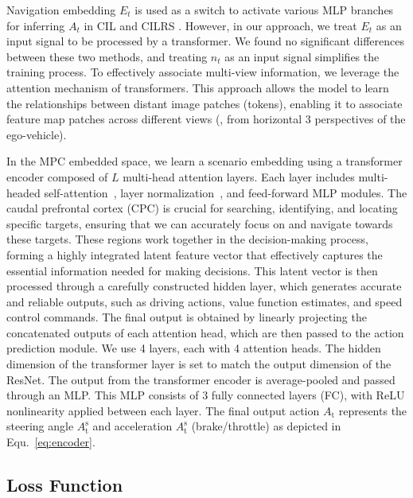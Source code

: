 Navigation embedding $E_{t}$ is used as a switch to activate various MLP branches for inferring $A_{t}$ in CIL \cite{Codevilla:2018} and CILRS \cite{Codevilla:2019}. 
However, in our approach, we treat $E_{t}$ as an input signal to be processed by a transformer. 
We found no significant differences between these two methods, and treating $n_{t}$ as an input signal simplifies the training process.
%
To effectively associate multi-view information, we leverage the attention mechanism of transformers\cite{Vaswani:2017}. 
This approach allows the model to learn the relationships between distant image patches (tokens), enabling it to associate feature map patches across different views ({\ie}, from horizontal 3 perspectives of the ego-vehicle). 


In the MPC embedded space, we learn a scenario embedding using a transformer encoder composed of $L$ multi-head attention layers. 
Each layer includes multi-headed self-attention~\cite{Vaswani:2017}, layer normalization~\cite{Ba:2016}, and feed-forward MLP modules. 
The caudal prefrontal cortex (CPC) is crucial for searching, identifying, and locating specific targets, ensuring that we can accurately focus on and navigate towards these targets. 
These regions work together in the decision-making process, forming a highly integrated latent feature vector that effectively captures the essential information needed for making decisions. 
This latent vector is then processed through a carefully constructed hidden layer, which generates accurate and reliable outputs, such as driving actions, value function estimates, and speed control commands.
The final output is obtained by linearly projecting the concatenated outputs of each attention head, which are then passed to the action prediction module.
We use 4 layers, each with 4 attention heads. 
The hidden dimension of the transformer layer is set to match the output dimension of the ResNet. 
%
The output from the transformer encoder is average-pooled and passed through an MLP.
This MLP consists of 3 fully connected layers (FC), with ReLU nonlinearity applied between each layer.
The final output action $A_\text{t}$ represents the steering angle $A_\text{t}^\text{s}$ and acceleration $A_\text{t}^\text{s}$ (brake/throttle) as depicted in Equ.~\ref{eq:encoder}. 





\subsection{Loss Function}

